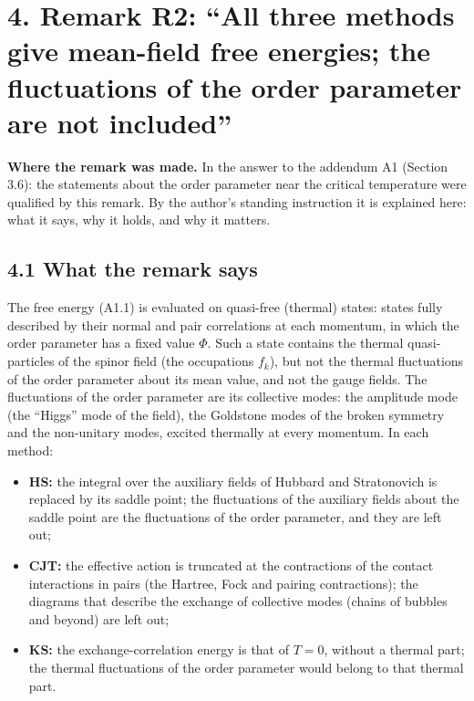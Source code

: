 \documentclass[
  10pt,
]{article}
\providecommand{\tightlist}{%
  \setlength{\itemsep}{0pt}\setlength{\parskip}{0pt}}
\begin{document}
\hypertarget{remark-r2-all-three-methods-give-mean-field-free-energies-the-fluctuations-of-the-order-parameter-are-not-included}{%
\section{4. Remark R2: ``All three methods give mean-field free
energies; the fluctuations of the order parameter are not
included''}\label{remark-r2-all-three-methods-give-mean-field-free-energies-the-fluctuations-of-the-order-parameter-are-not-included}}

\textbf{Where the remark was made.} In the answer to the addendum A1
(Section 3.6): the statements about the order parameter near the
critical temperature were qualified by this remark. By the author's
standing instruction it is explained here: what it says, why it holds,
and why it matters.

\hypertarget{what-the-remark-says}{%
\subsection{4.1 What the remark says}\label{what-the-remark-says}}

The free energy (A1.1) is evaluated on quasi-free (thermal) states:
states fully described by their normal and pair correlations at each
momentum, in which the order parameter has a fixed value \(\Phi\). Such
a state contains the thermal quasi-particles of the spinor field (the
occupations \(f_k\)), but not the thermal fluctuations of the order
parameter about its mean value, and not the gauge fields. The
fluctuations of the order parameter are its collective modes: the
amplitude mode (the ``Higgs'' mode of the field), the Goldstone modes of
the broken symmetry and the non-unitary modes, excited thermally at
every momentum. In each method:

\begin{itemize}
\tightlist
\item
  \textbf{HS:} the integral over the auxiliary fields of Hubbard and
  Stratonovich is replaced by its saddle point; the fluctuations of the
  auxiliary fields about the saddle point are the fluctuations of the
  order parameter, and they are left out;
\item
  \textbf{CJT:} the effective action is truncated at the contractions of
  the contact interactions in pairs (the Hartree, Fock and pairing
  contractions); the diagrams that describe the exchange of collective
  modes (chains of bubbles and beyond) are left out;
\item
  \textbf{KS:} the exchange-correlation energy is that of \(T=0\),
  without a thermal part; the thermal fluctuations of the order
  parameter would belong to that thermal part.
\end{itemize}
\end{document}
